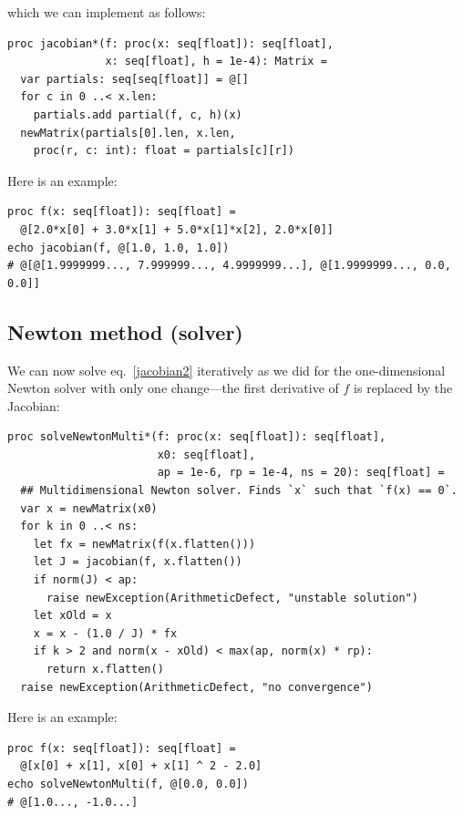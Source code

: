 \documentclass[justified, sixbynine]{tufte-book}
\def\ft{\small\tt}
\theoremstyle{plain}%
\newtheorem * {corollary}{Corollary}
\theoremstyle{definition}
\theoremstyle{remark}
\newtheorem * {remark}{Remark}
\newtheorem * {note}{Note}
\begin{document}
\begin{fullwidth}
which we can implement as follows:

\begin{lstlisting}[caption={in file: {\ft nlib/calculus.nim}}]
proc jacobian*(f: proc(x: seq[float]): seq[float],
               x: seq[float], h = 1e-4): Matrix =
  var partials: seq[seq[float]] = @[]
  for c in 0 ..< x.len:
    partials.add partial(f, c, h)(x)
  newMatrix(partials[0].len, x.len,
    proc(r, c: int): float = partials[c][r])
\end{lstlisting}

Here is an example:

\begin{lstlisting}
proc f(x: seq[float]): seq[float] =
  @[2.0*x[0] + 3.0*x[1] + 5.0*x[1]*x[2], 2.0*x[0]]
echo jacobian(f, @[1.0, 1.0, 1.0])
# @[@[1.9999999..., 7.999999..., 4.9999999...], @[1.9999999..., 0.0, 0.0]]
\end{lstlisting}

\goodbreak\subsection{Newton method (solver)}


We can now solve eq.~\ref{jacobian2} iteratively as we did for the one-dimensional Newton solver with only one change---the first derivative of $f$ is replaced by the Jacobian:

\begin{lstlisting}[caption={in file: {\ft nlib/solvers.nim}}]
proc solveNewtonMulti*(f: proc(x: seq[float]): seq[float],
                       x0: seq[float],
                       ap = 1e-6, rp = 1e-4, ns = 20): seq[float] =
  ## Multidimensional Newton solver. Finds `x` such that `f(x) == 0`.
  var x = newMatrix(x0)
  for k in 0 ..< ns:
    let fx = newMatrix(f(x.flatten()))
    let J = jacobian(f, x.flatten())
    if norm(J) < ap:
      raise newException(ArithmeticDefect, "unstable solution")
    let xOld = x
    x = x - (1.0 / J) * fx
    if k > 2 and norm(x - xOld) < max(ap, norm(x) * rp):
      return x.flatten()
  raise newException(ArithmeticDefect, "no convergence")
\end{lstlisting}

Here is an example:

\begin{lstlisting}
proc f(x: seq[float]): seq[float] =
  @[x[0] + x[1], x[0] + x[1] ^ 2 - 2.0]
echo solveNewtonMulti(f, @[0.0, 0.0])
# @[1.0..., -1.0...]
\end{lstlisting}


\end{fullwidth}
\end{document}
